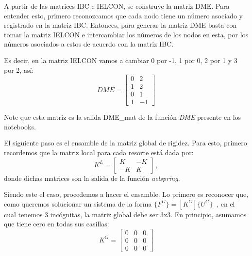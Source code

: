 A partir de las matrices IBC e IELCON, se construye la matriz DME. Para 
entender esto, primero reconozcamos que cada nodo tiene un número asociado y 
registrado en la matriz IBC. Entonces, para generar la matriz DME basta con 
tomar la matriz IELCON e intercambiar los números de los nodos en esta, por los 
números asociados a estos de acuerdo con la matriz IBC. 

Es decir, en la matriz IELCON vamos a cambiar 0 por -1, 1 por 0, 2 por 1 y 3 
por 2, así:
$$DME = 
\begin{bmatrix}
0 & 2 \\
1 & 2 \\
0 & 1 \\
1 & -1 
\end{bmatrix}
$$

Note que esta matriz es la salida DME\_mat de la función \textit{DME} presente 
en los notebooks.

El siguiente paso es el ensamble de la matriz global de rigidez. Para esto, 
primero recordemos que la matriz local para cada resorte está dada por:
$$K^L = 
\begin{bmatrix}
K & -K \\
-K & K 
\end{bmatrix}\, ,
$$
donde dichas matrices son la salida de la función \textit{uelspring}.


Siendo este el caso, procedemos a hacer el ensamble. Lo primero es reconocer 
que, como queremos solucionar un sistema de la forma $ \{ F^G \} = [ K^G ] \{ 
U^G \}\ $ , en el cual tenemos 3 incógnitas, la matriz global debe ser 3x3. En 
principio, asumamos que tiene cero en todas sus casillas:
$$K^G = 
\begin{bmatrix}
0 & 0 & 0 \\
0 & 0 & 0 \\
0 & 0 & 0 
\end{bmatrix}
$$

